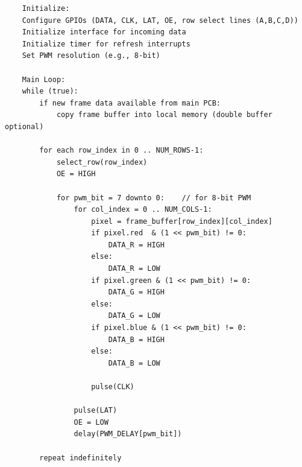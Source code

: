 \begin{lstlisting}
    Initialize:
    Configure GPIOs (DATA, CLK, LAT, OE, row select lines (A,B,C,D))
    Initialize interface for incoming data
    Initialize timer for refresh interrupts
    Set PWM resolution (e.g., 8-bit)

    Main Loop:
    while (true):
        if new frame data available from main PCB:
            copy frame buffer into local memory (double buffer optional)
        
        for each row_index in 0 .. NUM_ROWS-1:
            select_row(row_index)        
            OE = HIGH                   
            
            for pwm_bit = 7 downto 0:    // for 8-bit PWM
                for col_index = 0 .. NUM_COLS-1:
                    pixel = frame_buffer[row_index][col_index]
                    if pixel.red  & (1 << pwm_bit) != 0:
                        DATA_R = HIGH
                    else:
                        DATA_R = LOW
                    if pixel.green & (1 << pwm_bit) != 0:
                        DATA_G = HIGH
                    else:
                        DATA_G = LOW
                    if pixel.blue & (1 << pwm_bit) != 0:
                        DATA_B = HIGH
                    else:
                        DATA_B = LOW
                    
                    pulse(CLK)           
                    
                pulse(LAT)                
                OE = LOW                   
                delay(PWM_DELAY[pwm_bit])  
                
        repeat indefinitely
\end{lstlisting}

